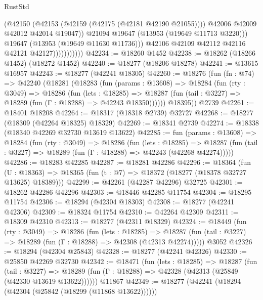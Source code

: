 \begin{lexlean}{RustStd}
\begin{coremodule}
                                (@42150
                                  (@42153 (@42159 (@42175 (@42181 @42190 @21055))))
                                  @42006
                                  @42009
                                  @42012
                                  @42014
                                  @19047))
                              @21094
                              @19647
                              (@13953 (@19649 @11713 @3220)))
                            @19647
                            (@13953 (@19649 @11630 @11736)))
                          @42106
                          @42109
                          @42112
                          @42116
                          @42121
                          @42127)))))))))))
@42234 := @18260 @1452
@42238 := @18262 (@18266 @1452) (@18272 @1452)
@42240 := @18277 (@18206 @18278)
@42241 := @13615 @16957
@42243 := @18277 (@42241 @18305)
@42260 := @18276
    (fun (fn : @74) =>
    @42240
      (@18281
        (@18283
          (fun (params : @13608) =>
          @18284
            (fun (rty : @3049) =>
            @18286
              (fun (lets : @18285) =>
              @18287 (fun (tail : @3227) => @18289 (fun (Γ : @18288) => @42243 @18350))))))
        @18395))
    @2739
@42261 := @18401 @18208
@42264 := @18317 (@18318 @2739) @32727
@42268 := @18277 (@18309 (@42264 @18325) @18329)
@42269 := @18341 @2739
@42274 := @18338 (@18340 @42269 @32730 @13619 @13622)
@42285 := fun (params : @13608) =>
  @18284
    (fun (rty : @3049) =>
    @18286
      (fun (lets : @18285) =>
      @18287 (fun (tail : @3227) => @18289 (fun (Γ : @18288) => @42243 (@42268 @42274)))))
@42286 := @18283 @42285
@42287 := @18281 @42286
@42296 := @18364
    (fun (U : @18363) => @18365 (fun (t : @7) => @18372 (@18277 (@18378 @32727 @13625) @18389)))
@42299 := @42261 (@42287 @42296) @32725
@42301 := @18262 @42286 @42296
@42303 := @18446 @42285 @11754
@42304 := @18295 @11754
@42306 := @18294 (@42304 @18303)
@42308 := @18277 (@42241 @42306)
@42309 := @18324 @11754
@42310 := @42264 @42309
@42311 := @18309 @42310
@42313 := @18277 (@42311 @18329)
@42324 := @18449
    (fun (rty : @3049) =>
    @18286
      (fun (lets : @18285) =>
      @18287 (fun (tail : @3227) => @18289 (fun (Γ : @18288) => @42308 (@42313 @42274)))))
    @3052
@42326 := @18294 (@42304 @25843)
@42328 := @18277 (@42241 @42326)
@42330 := @25850 @42269 @32730
@42342 := @18471
    (fun (lets : @18285) =>
    @18287
      (fun (tail : @3227) =>
      @18289 (fun (Γ : @18288) => @42328 (@42313 (@25849 (@42330 @13619 @13622))))))
    @11867
@42349 := @18277 (@42241 (@18294 (@42304 (@25842 (@18299 (@11868 @13622))))))

\end{coremodule}
\end{lexlean}
